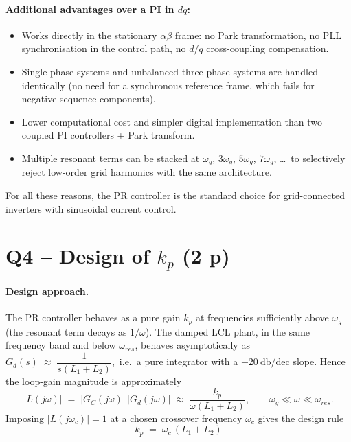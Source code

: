 \documentclass[11pt,a4paper]{article}
\begin{document}
\paragraph{Additional advantages over a PI in $dq$:}
\begin{itemize}[itemsep=2pt, topsep=2pt]
  \item Works directly in the stationary $\alpha\beta$ frame: no
        Park transformation, no PLL synchronisation in the control
        path, no $d/q$ cross-coupling compensation.
  \item Single-phase systems and unbalanced three-phase systems are
        handled identically (no need for a synchronous reference
        frame, which fails for negative-sequence components).
  \item Lower computational cost and simpler digital implementation
        than two coupled PI controllers + Park transform.
  \item Multiple resonant terms can be stacked at $\omega_g$,
        $3\omega_g$, $5\omega_g$, $7\omega_g$, \ldots\ to selectively
        reject low-order grid harmonics with the same architecture.
\end{itemize}
For all these reasons, the PR controller is the standard choice for
grid-connected inverters with sinusoidal current control.

\section{Q4 -- Design of $k_p$ (2 p)}

\paragraph{Design approach.}
The PR controller behaves as a pure gain $k_p$ at frequencies
sufficiently above $\omega_g$ (the resonant term decays as
$1/\omega$). The damped LCL plant, in the same frequency band and
below $\omega_{res}$, behaves asymptotically as
\(
G_d(s)\;\approx\;\dfrac{1}{s(L_1+L_2)},
\)
i.e.\ a pure integrator with a $-\SI{20}{\decibel}/\text{dec}$ slope.
Hence the loop-gain magnitude is approximately
\begin{equation}
|L(j\omega)| \;=\; |G_C(j\omega)|\,|G_d(j\omega)|
\;\approx\; \dfrac{k_p}{\omega(L_1+L_2)},
\qquad \omega_g \ll \omega \ll \omega_{res}.
\end{equation}
Imposing $|L(j\omega_c)|=1$ at a chosen crossover frequency $\omega_c$
gives the design rule
\begin{equation}
\boxed{\;k_p \;=\; \omega_c\,(L_1+L_2)\;}
\label{eq:kpdesign}
\end{equation}
\end{document}
